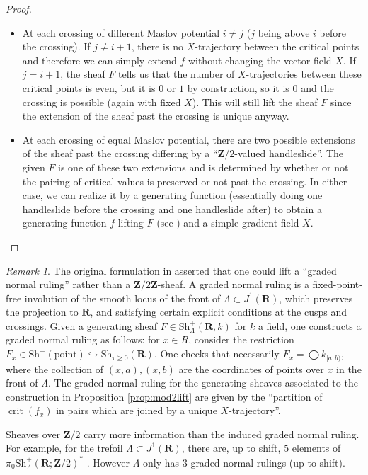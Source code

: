 \documentclass[12pt,a4paper]{article}
\numberwithin{equation}{section}
\theoremstyle{definition}
\theoremstyle{remark}
\newtheorem{remark}[equation]{Remark}
\newcommand{\Z}{\mathbf{Z}}
\newcommand{\R}{\mathbf{R}}
\newcommand{\Sh}{\mathrm{Sh}}
\DeclareMathOperator{\crit}{crit}
\begin{document}
\begin{proof}
\begin{itemize}
\item At each crossing of different Maslov potential $i\neq j$ ($j$ being above $i$ before the crossing).
If $j \neq i+1$, there is no $X$-trajectory between the critical points and therefore we can simply extend $f$
without changing the vector field $X$. If $j=i+1$, the sheaf $F$ tells us that the number of $X$-trajectories
between these critical points is even, but it is $0$ or $1$ by construction, so it is $0$
and the crossing is possible (again with fixed $X$). This will still lift the sheaf $F$ since the extension
of the sheaf past the crossing is unique anyway.

\item  At each crossing of equal Maslov potential, there are two possible extensions of the sheaf
past the crossing differing by a ``$\Z/2$-valued handleslide''. The given $F$ is one of these two extensions
and is determined by whether or not the pairing
of critical values is preserved or not past the crossing. In either case, we can
realize it by a generating function (essentially doing one handleslide before the crossing
and one handleslide after) to obtain a generating function $f$ lifting $F$ (see \cite{Fuchs-Rutherford})
and a simple gradient field $X$.
\end{itemize}
\end{proof}


\begin{remark}
The original formulation in \cite{Fuchs-Rutherford} asserted that one could lift a ``graded normal ruling'' rather than a $\Z/2\Z$-sheaf.  A graded normal ruling is a fixed-point-free involution of the smooth locus of the front of $\Lambda \subset J^1(\R)$, which preserves the projection to $\R$, and satisfying certain explicit conditions at the cusps and crossings.  Given a generating sheaf $F \in \Sh^+_\Lambda(\R,k)$ for $k$ a field, one constructs a graded normal ruling as follows: for $x \in
R$, consider the restriction $F_x \in \Sh^+(\mathrm{point}) \hookrightarrow \Sh_{\tau \ge 0}(\R)$.  One checks that necessarily $F_x = \bigoplus k_{[a,b)}$, where the collection of $(x,a), (x,b)$ are the coordinates of points over $x$ in the front of $\Lambda$.  The graded normal ruling for the generating sheaves associated to the construction in Proposition \ref{prop:mod2lift} are given by the ``partition of $\crit(f_x)$ in pairs which are joined by a unique $X$-trajectory''.

Sheaves over $\Z/2$ carry more information than the induced graded normal ruling.
For example, for the trefoil $\Lambda \subset J^1(\R)$, there are, up to shift, $5$ elements of $\pi_0 \Sh^+_\Lambda(\R; \Z/2)^*$ \cite[Example 6.38]{STZ}.  However $\Lambda$ only has $3$ graded normal rulings (up to shift).
\end{remark}
\end{document}
